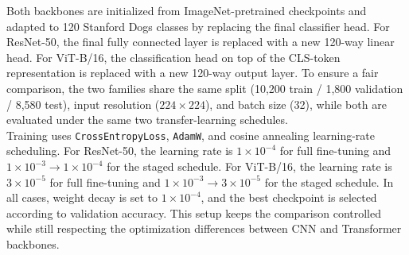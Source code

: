 \documentclass[twoside,final]{hcmut-report}
\begin{document}
Both backbones are initialized from ImageNet-pretrained checkpoints and adapted to 120 Stanford Dogs classes by replacing the final classifier head. For ResNet-50, the final fully connected layer is replaced with a new 120-way linear head. For ViT-B/16, the classification head on top of the CLS-token representation is replaced with a new 120-way output layer. To ensure a fair comparison, the two families share the same split (10,200 train / 1,800 validation / 8,580 test), input resolution ($224 \times 224$), and batch size (32), while both are evaluated under the same two transfer-learning schedules.\\

Training uses \texttt{CrossEntropyLoss}, \texttt{AdamW}, and cosine annealing learning-rate scheduling. For ResNet-50, the learning rate is $1\times10^{-4}$ for full fine-tuning and $1\times10^{-3} \rightarrow 1\times10^{-4}$ for the staged schedule. For ViT-B/16, the learning rate is $3\times10^{-5}$ for full fine-tuning and $1\times10^{-3} \rightarrow 3\times10^{-5}$ for the staged schedule. In all cases, weight decay is set to $1\times10^{-4}$, and the best checkpoint is selected according to validation accuracy. This setup keeps the comparison controlled while still respecting the optimization differences between CNN and Transformer backbones.
\end{document}
